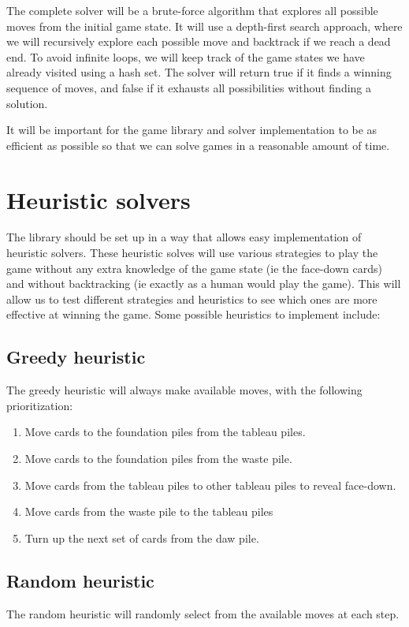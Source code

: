 \documentclass[11pt]{article}
\begin{document}
The complete solver will be a brute-force algorithm that explores all possible moves from the initial game state.
It will use a depth-first search approach, where we will recursively explore each possible move and backtrack if we reach a dead end.
To avoid infinite loops, we will keep track of the game states we have already visited using a hash set.
The solver will return true if it finds a winning sequence of moves, and false if it exhausts all possibilities without finding a solution.

It will be important for the game library and solver implementation to be as efficient as possible so that we can solve games in a reasonable amount of time.

\section{Heuristic solvers}

The library should be set up in a way that allows easy implementation of heuristic solvers.
These heuristic solves will use various strategies to play the game without any extra knowledge of the game state (ie the face-down cards) and without backtracking (ie exactly as a human would play the game).
This will allow us to test different strategies and heuristics to see which ones are more effective at winning the game.
Some possible heuristics to implement include:

\subsection{Greedy heuristic}

The greedy heuristic will always make available moves, with the following prioritization:
\begin{enumerate}
    \item Move cards to the foundation piles from the tableau piles.
    \item Move cards to the foundation piles from the waste pile.
    \item Move cards from the tableau piles to other tableau piles to reveal face-down.
    \item Move cards from the waste pile to the tableau piles
    \item Turn up the next set of cards from the daw pile.
\end{enumerate}

\subsection{Random heuristic}
The random heuristic will randomly select from the available moves at each step.
\end{document}

